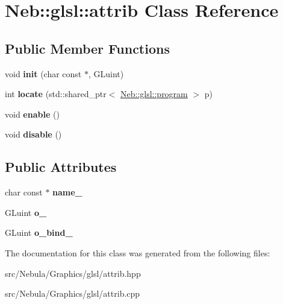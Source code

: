 \hypertarget{classNeb_1_1glsl_1_1attrib}{\section{\-Neb\-:\-:glsl\-:\-:attrib \-Class \-Reference}
\label{classNeb_1_1glsl_1_1attrib}
}
\subsection*{\-Public \-Member \-Functions}
\begin{DoxyCompactItemize}
\item 
\hypertarget{classNeb_1_1glsl_1_1attrib_afb24889a6728269a254336c3f86cd5bc}{void {\bfseries init} (char const $\ast$, \-G\-Luint)}\label{classNeb_1_1glsl_1_1attrib_afb24889a6728269a254336c3f86cd5bc}

\item 
\hypertarget{classNeb_1_1glsl_1_1attrib_a83769556327a84a8bc29d1a65d452f12}{int {\bfseries locate} (std\-::shared\-\_\-ptr$<$ \hyperlink{classNeb_1_1glsl_1_1program}{\-Neb\-::glsl\-::program} $>$ p)}\label{classNeb_1_1glsl_1_1attrib_a83769556327a84a8bc29d1a65d452f12}

\item 
\hypertarget{classNeb_1_1glsl_1_1attrib_a2fad8a1a708d0eb8fdd5bf121623a3d2}{void {\bfseries enable} ()}\label{classNeb_1_1glsl_1_1attrib_a2fad8a1a708d0eb8fdd5bf121623a3d2}

\item 
\hypertarget{classNeb_1_1glsl_1_1attrib_a4625fa64ffbf21dd803410cf1e24c7ec}{void {\bfseries disable} ()}\label{classNeb_1_1glsl_1_1attrib_a4625fa64ffbf21dd803410cf1e24c7ec}

\end{DoxyCompactItemize}
\subsection*{\-Public \-Attributes}
\begin{DoxyCompactItemize}
\item 
\hypertarget{classNeb_1_1glsl_1_1attrib_ace010923299383f6c7f9023906597238}{char const $\ast$ {\bfseries name\-\_\-}}\label{classNeb_1_1glsl_1_1attrib_ace010923299383f6c7f9023906597238}

\item 
\hypertarget{classNeb_1_1glsl_1_1attrib_aa37e743b20a0e901d3274f4b88497195}{\-G\-Luint {\bfseries o\-\_\-}}\label{classNeb_1_1glsl_1_1attrib_aa37e743b20a0e901d3274f4b88497195}

\item 
\hypertarget{classNeb_1_1glsl_1_1attrib_acef1f0c5eb1de70001f4590e33eb9631}{\-G\-Luint {\bfseries o\-\_\-bind\-\_\-}}\label{classNeb_1_1glsl_1_1attrib_acef1f0c5eb1de70001f4590e33eb9631}

\end{DoxyCompactItemize}


\-The documentation for this class was generated from the following files\-:\begin{DoxyCompactItemize}
\item 
src/\-Nebula/\-Graphics/glsl/attrib.\-hpp\item 
src/\-Nebula/\-Graphics/glsl/attrib.\-cpp\end{DoxyCompactItemize}
